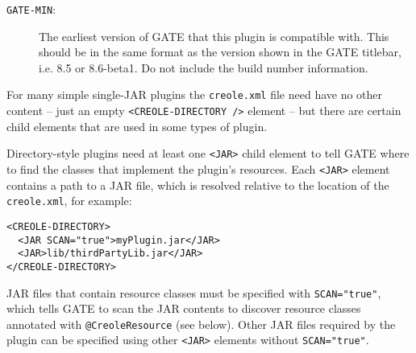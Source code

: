 \begin{description}
\item[{\tt GATE-MIN}:] The  earliest version of GATE that this plugin is compatible
with. This should be in the same format as the version shown in the GATE titlebar, i.e.
8.5 or 8.6-beta1. Do not include the build number information.
\end{description}

For many simple single-JAR plugins the {\tt creole.xml} file need have no other
content -- just an empty \verb|<CREOLE-DIRECTORY />| element -- but there are
certain child elements that are used in some types of plugin.

Directory-style plugins need at least one \verb|<JAR>| child element to tell
GATE where to find the classes that implement the plugin's resources.  Each
\verb|<JAR>| element contains a path to a JAR file, which is resolved relative
to the location of the {\tt creole.xml}, for example:
\begin{small}\begin{verbatim}
<CREOLE-DIRECTORY>
  <JAR SCAN="true">myPlugin.jar</JAR>
  <JAR>lib/thirdPartyLib.jar</JAR>
</CREOLE-DIRECTORY>
\end{verbatim}\end{small}

JAR files that contain resource classes must be specified with
\verb|SCAN="true"|, which tells GATE to scan the JAR contents to discover
resource classes annotated with \verb|@CreoleResource| (see below).  Other JAR
files required by the plugin can be specified using other \verb|<JAR>| elements
without \verb|SCAN="true"|.


